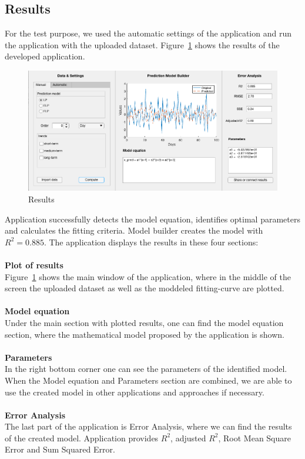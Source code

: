         \subsection{Results}\label{subsec:result}
        For the test purpose, we used the automatic settings of the application and run the application with the uploaded
       dataset. Figure~\ref{fig:results} shows the results of the developed application.
               \begin{figure}[h!]
        \centering
            \includegraphics[width=\textwidth]{figures/result.png}
            \caption{Results}
            \label{fig:results}
    \end{figure}
        Application successfully detects the model equation, identifies optimal parameters and 
        calculates the fitting criteria. Model builder creates the model with $R^2 = 0.885$.
        The application displays the results in these four sections:\\
        \\
        \textbf{Plot of results}\\
       Figure~\ref{fig:results} shows the main window of the application, where in the middle of the screen
       the uploaded dataset as well as the moddeled fitting-curve are plotted.\\
        \\
        \textbf{Model equation}\\
        Under the main section with plotted results, one can find the model equation section, where
       the mathematical model proposed by the application is shown.\\
        \\
        \textbf{Parameters}\\
        In the right bottom corner one can see the parameters of the identified model. When the
        Model equation and Parameters section are combined, we are able to use the created model in other
        applications and approaches if necessary.\\
        \\
        \textbf{Error Analysis}\\
        The last part of the application is Error Analysis, where we can find the 
        results of the created model. Application provides $R^2$, adjusted $R^2$,
        Root Mean Square Error and Sum Squared Error.
        
        